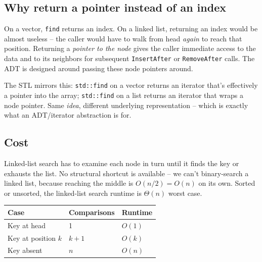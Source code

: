 \documentclass[11pt]{article}
\begin{document}
\subsection{Why return a pointer instead of an index}

\begin{warnbox}
On a vector, \texttt{find} returns an index. On a linked list,
returning an index would be almost useless -- the caller would have
to walk from head \emph{again} to reach that position. Returning a
\emph{pointer to the node} gives the caller immediate access to the
data and to its neighbors for subsequent \texttt{InsertAfter} or
\texttt{RemoveAfter} calls. The ADT is designed around passing
these node pointers around.

The STL mirrors this: \texttt{std::find} on a vector returns an
iterator that's effectively a pointer into the array;
\texttt{std::find} on a list returns an iterator that wraps a node
pointer. Same \emph{idea}, different underlying representation --
which is exactly what an ADT/iterator abstraction is for.
\end{warnbox}

\subsection{Cost}

\begin{ideabox}[$O(n)$, always]
Linked-list search has to examine each node in turn until it finds
the key or exhausts the list. No structural shortcut is available
-- we can't binary-search a linked list, because reaching the
middle is $O(n/2) = O(n)$ on its own. Sorted or unsorted, the
linked-list search runtime is $\Theta(n)$ worst case.
\end{ideabox}

\begin{center}
\footnotesize
\renewcommand{\arraystretch}{1.25}
\begin{tabular}{@{}lll@{}}
\hline
\textbf{Case}    & \textbf{Comparisons} & \textbf{Runtime} \\
\hline
Key at head       & 1                   & $O(1)$ \\
Key at position $k$ & $k + 1$           & $O(k)$ \\
Key absent         & $n$                & $O(n)$ \\
\hline
\end{tabular}
\end{center}
\end{document}
